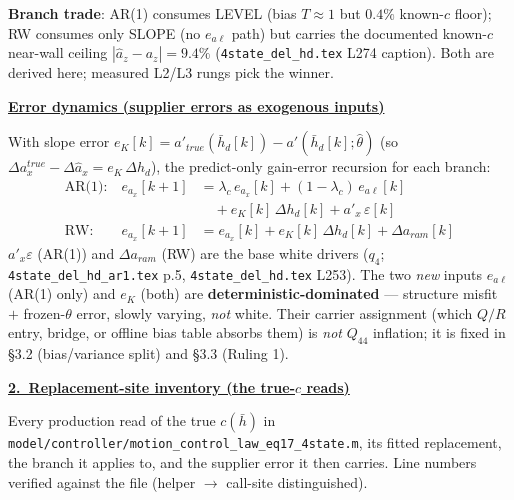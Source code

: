 \documentclass[11pt,a4paper,fontset=none]{ctexart}
\newcommand{\lc}{\lambda_c}
\newcommand{\hd}[1]{\par\medskip\noindent\underline{\textbf{#1}}\par\nobreak\vspace{0.2ex}}
\newcommand{\hbd}{\bar h_d}
\newcommand{\ealev}{e_{a\ell}}
\begin{document}
\textbf{Branch trade}: AR(1) consumes LEVEL (bias $T\!\approx\!1$ but $0.4\%$ known-$c$ floor); RW consumes only SLOPE (no $\ealev$ path) but carries the documented known-$c$ near-wall ceiling $|\hat a_z-a_z|=9.4\%$ (\texttt{4state\_del\_hd.tex} L274 caption). Both are derived here; measured L2/L3 rungs pick the winner.

\hd{Error dynamics (supplier errors as exogenous inputs)}
With slope error $e_K[k] = a'_{true}(\hbd[k]) - a'(\hbd[k];\hat\theta)$ (so $\Delta a_x^{true}-\Delta\hat a_x = e_K\,\Delta h_d$), the predict-only gain-error recursion for each branch:
\[
\begin{aligned}
\text{AR(1):}\quad e_{a_x}[k+1] &= \lc\, e_{a_x}[k] + (1-\lc)\,\ealev[k] \\
   &\quad + e_K[k]\,\Delta h_d[k] + a'_x\,\varepsilon[k] \\
\text{RW:}\qquad e_{a_x}[k+1] &= e_{a_x}[k] + e_K[k]\,\Delta h_d[k] + \Delta a_{ram}[k]
\end{aligned}
\]
$a'_x\varepsilon$ (AR(1)) and $\Delta a_{ram}$ (RW) are the base white drivers ($q_4$; \texttt{4state\_del\_hd\_ar1.tex} p.5, \texttt{4state\_del\_hd.tex} L253). The two \emph{new} inputs $\ealev$ (AR(1) only) and $e_K$ (both) are \textbf{deterministic-dominated} --- structure misfit $+$ frozen-$\theta$ error, slowly varying, \emph{not} white. Their carrier assignment (which $Q/R$ entry, bridge, or offline bias table absorbs them) is \emph{not} $Q_{44}$ inflation; it is fixed in \S3.2 (bias/variance split) and \S3.3 (Ruling 1).

\newpage
\hd{2.\ Replacement-site inventory (the true-$c$ reads)}

Every production read of the true $c(\bar h)$ in \texttt{model/controller/motion\_control\_law\_eq17\_4state.m}, its fitted replacement, the branch it applies to, and the supplier error it then carries. Line numbers verified against the file (helper $\to$ call-site distinguished).
\end{document}
